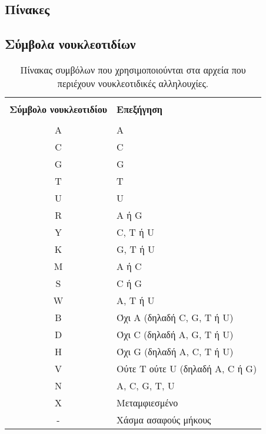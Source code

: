 \begin{refsection}
\chapter{Πίνακες}
\section{Σύμβολα νουκλεοτιδίων}\label{noukl_symbols}
\begin{table}[ht] \centering \small
\caption[Πίνακας συμβόλων νουκλεοτιδίων]{Πίνακας συμβόλων που χρησιμοποιούνται στα αρχεία που περιέχουν νουκλεοτιδικές αλληλουχίες.}
\vspace{2mm}
\begin{tabular} {c l}
 \hline
	&	\\
\textbf{Σύμβολο νουκλεοτιδίου}	& \textbf{Επεξήγηση} \\
	&	\\
 \hline
A 	& 	A\\
C	& 	C\\
G 	& 	G \\
T	& 	T \\
U	& 	U\\
R 	& 	A ή G\\
Y & 		C, T ή U\\
K	&	G, T ή U\\
M	&	A ή C\\
S	&	C ή G\\
W	&	A, T ή U\\
B	&	Όχι A (δηλαδή C, G, T ή U)\\
D	&	Όχι C (δηλαδή A, G, T ή U)\\
H	&	Όχι G (δηλαδή A, C, T ή U)\\
V	&	Ούτε T ούτε U (δηλαδή A, C ή G)\\
N	&	A, C, G, T, U\\
X	&	Μεταμφιεσμένο\\
-	&	Χάσμα ασαφούς μήκους\\
\hline
\end{tabular}
\label{table:table_2_2}
\end{table}
\newpage

\end{refsection}
